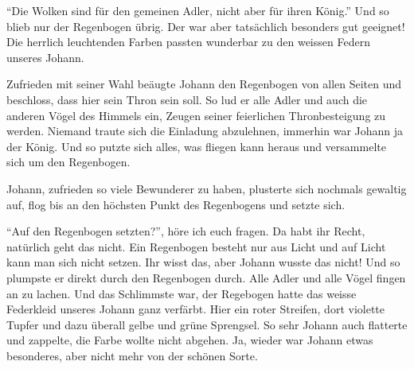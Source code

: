 

\enquote{Die Wolken sind für den gemeinen Adler, nicht aber für ihren König.} Und so blieb nur der Regenbogen übrig. Der war aber tatsächlich besonders gut geeignet! Die herrlich leuchtenden Farben passten wunderbar zu den weissen Federn unseres Johann. 

Zufrieden mit seiner Wahl beäugte Johann den Regenbogen von allen Seiten und beschloss, dass hier sein Thron sein soll. So lud er alle Adler und auch die anderen Vögel des Himmels ein, Zeugen seiner feierlichen Thronbesteigung zu werden. Niemand traute sich die Einladung abzulehnen, immerhin war Johann ja der König. Und so putzte sich alles, was fliegen kann heraus und versammelte sich um den Regenbogen.

Johann, zufrieden so viele Bewunderer zu haben, plusterte sich nochmals gewaltig auf, flog bis an den höchsten Punkt des Regenbogens und setzte sich.

\enquote{Auf den Regenbogen setzten?}, höre ich euch fragen. Da habt ihr Recht, natürlich geht das nicht. Ein Regenbogen besteht nur aus Licht und auf Licht kann man sich nicht setzen. Ihr wisst das, aber Johann wusste das nicht! Und so plumpste er direkt durch den Regenbogen durch. Alle Adler und alle Vögel fingen an zu lachen. Und das Schlimmste war, der Regebogen hatte das weisse Federkleid unseres Johann ganz verfärbt. Hier ein roter Streifen, dort violette Tupfer und dazu überall gelbe und grüne Sprengsel. So sehr Johann auch flatterte und zappelte, die Farbe wollte nicht abgehen. Ja, wieder war Johann etwas besonderes, aber nicht mehr von der schönen Sorte.

